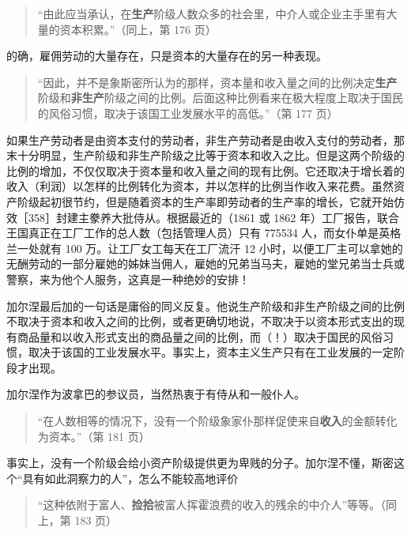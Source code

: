 \begin{quote}“由此应当承认，在\textbf{生产}阶级人数众多的社会里，中介人或企业主手里有大量的资本积累。”（同上，第 176 页）\end{quote}

的确，雇佣劳动的大量存在，只是资本的大量存在的另一种表现。

\begin{quote}“因此，并不是象斯密所认为的那样，资本量和收入量之间的比例决定\textbf{生产}阶级和\textbf{非生产}阶级之间的比例。后面这种比例看来在极大程度上取决于国民的风俗习惯，取决于该国工业发展水平的高低。”（第 177 页）\end{quote}

如果生产劳动者是由资本支付的劳动者，非生产劳动者是由收入支付的劳动者，那末十分明显，生产阶级和非生产阶级之比等于资本和收入之比。但是这两个阶级的比例的增加，不仅仅取决于资本量和收入量之间的现有比例。它还取决于增长着的收入（利润）以怎样的比例转化为资本，并以怎样的比例当作收入来花费。虽然资产阶级起初很节约，但是随着资本的生产率即劳动者的生产率的增长，它就开始仿效［358］封建主豢养大批侍从。根据最近的（1861 或 1862 年）工厂报告，联合王国真正在工厂工作的总人数（包括管理人员）只有 775534 人，而女仆单是英格兰一处就有 100 万。让工厂女工每天在工厂流汗 12 小时，以便工厂主可以拿她的无酬劳动的一部分雇她的姊妹当佣人，雇她的兄弟当马夫，雇她的堂兄弟当士兵或警察，来为他个人服务，这真是一种绝妙的安排！

加尔涅最后加的一句话是庸俗的同义反复。他说生产阶级和非生产阶级之间的比例不取决于资本和收入之间的比例，或者更确切地说，不取决于以资本形式支出的现有商品量和以收入形式支出的商品量之间的比例，而（！）取决于国民的风俗习惯，取决于该国的工业发展水平。事实上，资本主义生产只有在工业发展的一定阶段才出现。

加尔涅作为波拿巴的参议员，当然热衷于有侍从和一般仆人。

\begin{quote}“在人数相等的情况下，没有一个阶级象家仆那样促使来自\textbf{收入}的金额转化为资本。”（第 181 页）\end{quote}

事实上，没有一个阶级会给小资产阶级提供更为卑贱的分子。加尔涅不懂，斯密这个“具有如此洞察力的人”，怎么不能较高地评价

\begin{quote}“这种依附于富人、\textbf{捡拾}被富人挥霍浪费的收入的残余的中介人”等等。（同上，第 183 页）\end{quote}

